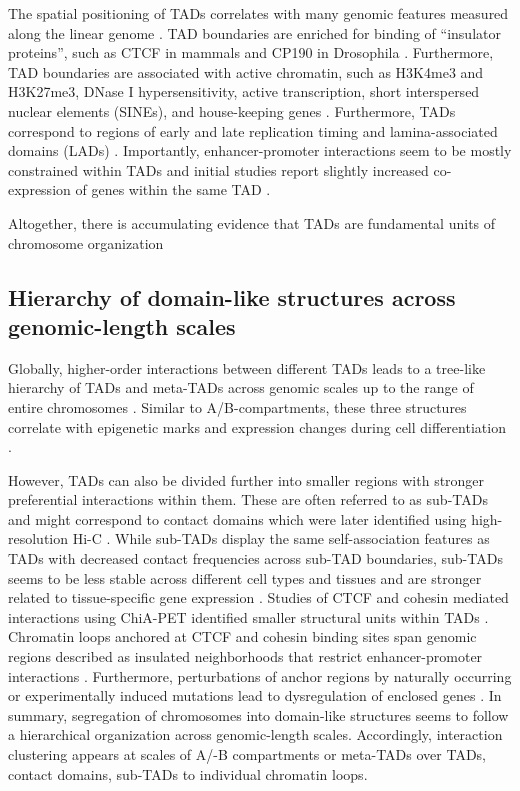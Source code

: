 \documentclass[a4paper,twoside=true,openright,parskip=full,chapterprefix=true,11pt,headings=normal,bibliography=totoc,listof=totoc,titlepage=on,captions=tableabove,draft=false]{scrreprt}
\theoremstyle{definition}
\theoremstyle{definition}
\theoremstyle{definition}
\theoremstyle{remark}
\begin{document}
The spatial positioning of TADs correlates with many genomic features
measured along the linear genome \citep{Merkenschlager2016}. TAD
boundaries are enriched for binding of ``insulator proteins'', such as
CTCF in mammals and CP190 in Drosophila \citep{Dixon2012, Sexton2012}.
Furthermore, TAD boundaries are associated with active chromatin, such
as H3K4me3 and H3K27me3, DNase I hypersensitivity, active transcription,
short interspersed nuclear elements (SINEs), and house-keeping genes
\citep{Dixon2012}. Furthermore, TADs correspond to regions of early and
late replication timing \citep{Pope2014, Dileep2015} and
lamina-associated domains (LADs) \citep{Dixon2012}. Importantly,
enhancer-promoter interactions seem to be mostly constrained within TADs
\citep{Shen2012, Ghavi-helm2014, Symmons2014} and initial studies report
slightly increased co-expression of genes within the same TAD
\citep{Nora2012}.

Altogether, there is accumulating evidence that TADs are fundamental
units of chromosome organization \citep{Dixon2016}

\hypertarget{hierarchy-of-domain-like-structures-across-genomic-length-scales}{%
\subsection{Hierarchy of domain-like structures across genomic-length
scales}\label{hierarchy-of-domain-like-structures-across-genomic-length-scales}}

Globally, higher-order interactions between different TADs leads to a
tree-like hierarchy of TADs and meta-TADs across genomic scales up to
the range of entire chromosomes \citep{Fraser2015}. Similar to
A/B-compartments, these three structures correlate with epigenetic marks
and expression changes during cell differentiation \citep{Fraser2015}.

However, TADs can also be divided further into smaller regions with
stronger preferential interactions within them. These are often referred
to as sub-TADs \citep{Phillips-Cremins2013} and might correspond to
contact domains which were later identified using high-resolution Hi-C
\citep{Rao2014}. While sub-TADs display the same self-association
features as TADs with decreased contact frequencies across sub-TAD
boundaries, sub-TADs seems to be less stable across different cell types
and tissues and are stronger related to tissue-specific gene expression
\citep{Berlivet2013, Phillips-Cremins2013}. Studies of CTCF and cohesin
mediated interactions using ChiA-PET identified smaller structural units
within TADs \citep{Dowen2014}. Chromatin loops anchored at CTCF and
cohesin binding sites span genomic regions described as insulated
neighborhoods that restrict enhancer-promoter interactions
\citep{Hnisz2016a}. Furthermore, perturbations of anchor regions by
naturally occurring or experimentally induced mutations lead to
dysregulation of enclosed genes \citep{Dowen2014, Hnisz2016, Ji2016}. In
summary, segregation of chromosomes into domain-like structures seems to
follow a hierarchical organization across genomic-length scales.
Accordingly, interaction clustering appears at scales of A/-B
compartments or meta-TADs over TADs, contact domains, sub-TADs to
individual chromatin loops.
\end{document}
